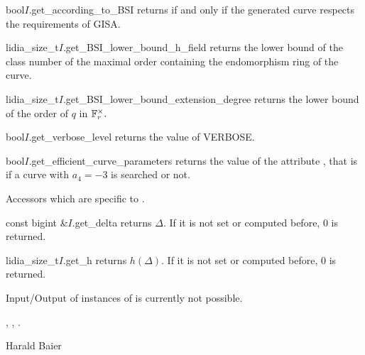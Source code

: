 \begin{cfcode}{bool}{$I$.get_according_to_BSI}{}
  returns  if and only if the generated
  curve respects the requirements of GISA.
\end{cfcode}

\begin{cfcode}{lidia_size_t}{$I$.get_BSI_lower_bound_h_field}{}
  returns the lower bound of the class number of the
  maximal order containing the endomorphism ring of the curve.
\end{cfcode}

\begin{cfcode}{lidia_size_t}{$I$.get_BSI_lower_bound_extension_degree}{}
  returns the lower bound of the order of $q$ in $\mathbb{F}_r^\times.$
\end{cfcode}

\begin{cfcode}{bool}{$I$.get_verbose_level}{}
  returns the value of VERBOSE.
\end{cfcode}

\begin{cfcode}{bool}{$I$.get_efficient_curve_parameters}{}
  returns the value of the attribute
  , that is if a curve with $a_4=-3$
  is searched or not.
\end{cfcode}


Accessors which are specific to . 

\begin{cfcode}{const bigint &}{$I$.get_delta}{}
  returns $\Delta.$ If it is not set or computed before,
  0 is returned.
\end{cfcode}

\begin{cfcode}{lidia_size_t}{$I$.get_h}{}
  returns $h(\Delta).$ If it is not set or computed before,
  0 is returned.
\end{cfcode}



\IO

Input/Output of instances of  is currently not possible.



\SEEALSO

, ,
.



\NOTES



\AUTHOR

Harald Baier
